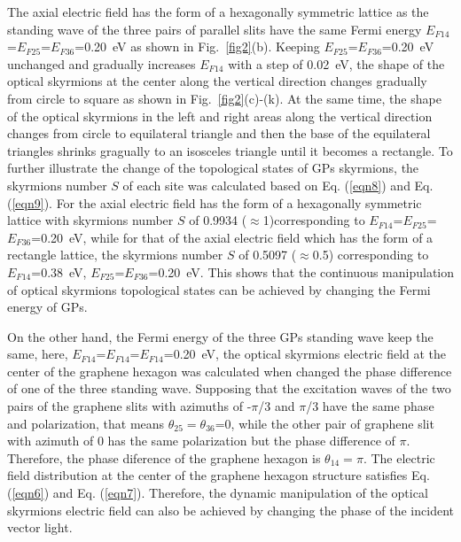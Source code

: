 \documentclass{optica-article}
\begin{document}
The axial electric field has the form of a hexagonally symmetric lattice as the standing wave of the three pairs of parallel slits have the same Fermi energy $E_{F14}$=$E_{F25}$=$E_{F36}$=0.20~eV as shown in Fig.~\ref{fig2}(b). Keeping $E_{F25}$=$E_{F36}$=0.20~eV unchanged and gradually increases $E_{F14}$ with a step of 0.02~eV, the shape of the optical skyrmions at the center along the vertical direction changes gradually from circle to square as shown in Fig.~\ref{fig2}(c)-(k). At the same time, the shape of the optical skyrmions in the left and right areas along the vertical direction changes from circle to equilateral triangle and then the base of the equilateral triangles shrinks gragually to an isosceles triangle until it becomes a rectangle. 
To further illustrate the change of the topological states of GPs skyrmions, the skyrmions number $S$ of each site was calculated based on Eq. (\ref{eqn8}) and Eq. (\ref{eqn9}). For the axial electric field has the form of a hexagonally symmetric lattice with skyrmions number $S$ of 0.9934 ($\approx$1)corresponding to $E_{F14}$=$E_{F25}$=$E_{F36}$=0.20~eV, while for that of the axial electric field which has the form of a rectangle lattice, the skyrmions number $S$ of 0.5097 ($\approx$0.5) corresponding to $E_{F14}$=0.38~eV, $E_{F25}$=$E_{F36}$=0.20~eV. This shows that the continuous manipulation of optical skyrmions topological states can be achieved by changing the Fermi energy of GPs. 

On the other hand, the Fermi energy of the three GPs standing wave keep the same, here, $E_{F14}$=$E_{F14}$=$E_{F14}$=0.20~eV, the optical skyrmions electric field at the center of the graphene hexagon was calculated when changed the phase difference of one of the three standing wave. Supposing that the excitation waves of the two pairs of the graphene slits with azimuths of -$\pi$/3 and $\pi$/3 have the same phase and polarization, that means $\theta_{25}=\theta_{36}$=0, while the other pair of graphene slit with azimuth of 0 has the same polarization but the phase difference of $\pi$. Therefore, the phase diference of the graphene hexagon is $\theta_{14}=\pi$. The electric field distribution at the center of the graphene hexagon structure satisfies Eq. (\ref{eqn6}) and Eq. (\ref{eqn7}). Therefore, the dynamic manipulation of the optical skyrmions electric field can also be achieved by changing the phase of the incident vector light. 
\end{document}
